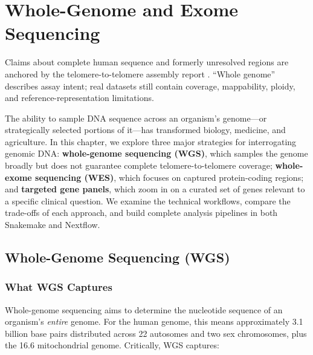 \chapter{Whole-Genome and Exome Sequencing}
\label{ch:genomeseq}

\begin{sourcebox}
Claims about complete human sequence and formerly unresolved regions are anchored by the telomere-to-telomere assembly report \cite{nurk2022}. ``Whole genome'' describes assay intent; real datasets still contain coverage, mappability, ploidy, and reference-representation limitations.
\end{sourcebox}

The ability to sample DNA sequence across an organism's genome---or strategically selected portions of it---has transformed biology, medicine, and agriculture. In this chapter, we explore three major strategies for interrogating genomic DNA: \textbf{whole-genome sequencing (WGS)}, which samples the genome broadly but does not guarantee complete telomere-to-telomere coverage; \textbf{whole-exome sequencing (WES)}, which focuses on captured protein-coding regions; and \textbf{targeted gene panels}, which zoom in on a curated set of genes relevant to a specific clinical question. We examine the technical workflows, compare the trade-offs of each approach, and build complete analysis pipelines in both Snakemake and Nextflow.

\section{Whole-Genome Sequencing (WGS)}
\label{sec:wgs}

\subsection{What WGS Captures}

Whole-genome sequencing aims to determine the nucleotide sequence of an organism's \emph{entire} genome. For the human genome, this means approximately 3.1 billion base pairs distributed across 22 autosomes and two sex chromosomes, plus the 16.6\kilobase{} mitochondrial genome. Critically, WGS captures:

